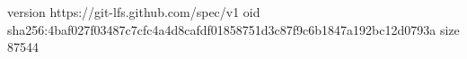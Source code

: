 version https://git-lfs.github.com/spec/v1
oid sha256:4baf027f03487c7cfc4a4d8cafdf01858751d3c87f9c6b1847a192bc12d0793a
size 87544
